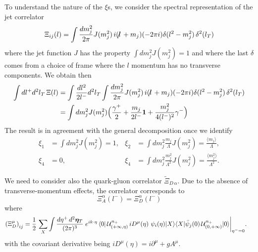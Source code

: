 \documentclass[preprintnumbers,floatfix,nofootinbib]{revtex4}
\newcommand{\lslash}{l \hspace{-0.19cm} / \,}
\newcommand{\de}{d}                    %
\newcommand{\ii}{i}                    %
\begin{document}
To understand the nature of the $\xi$s, we consider the spectral
representation of the jet correlator
\begin{equation}
\Xi_{ij}(l) = \int \frac{d m_j^2}{2 \pi} J(m_j^2)\, \ii (\lslash +m_j) (-2 \pi \ii)
\delta(l^2 -m_j^2) \, \delta^2(l_T)
\label{e:spectral}
\end{equation} 
where the jet function $J$ has the property $\int dm_j^2 J(m_j^2) = 1$ and 
where the last $\delta$ comes from a choice of frame where the $l$ momentum
has no transverse components.
We obtain then
\begin{equation}
\begin{split} 
\int d l^+ d^2 l_T\, \Xi(l) &= \int \frac{d l^2}{2l^-} d^2l_T  
 \int \frac{d m_j^2}{2 \pi} J(m_j^2)\, \ii (\lslash +m_j) (-2 \pi \ii)
\delta(l^2 -m_j^2) \, \delta^2(l_T)
\\
& = \int d m_j^2 J(m_j^2) \Bigl( \frac{\gamma^+}{2} + \frac{m_j}{2 l^-} {\bm 1}
+\frac{m_j^2}{4 (l^-)^2} \gamma^- \Bigr)
\label{e:jetspectral}
\end{split} 
\end{equation} 
The result is in agreement with the general decomposition once we identify
\begin{align}
\xi_1 &= \int dm_j^2 J(m_j^2) = 1,
&
\xi_2 &= \int dm_j^2 \frac{m_j}{\Lambda} J(m_j^2) = \frac{\langle m_j \rangle}{\Lambda},
\\
\xi_4 &= 0,
&
\xi_4 &= \int dm_j^2 \frac{m_j^2}{\Lambda^2} J(m_j^2) = \frac{\langle m_j^2 \rangle}{\Lambda^2}.
\end{align} 


We need to consider also the quark-gluon correlator 
$\tilde{\Xi}_{D\, \alpha}$. Due to the absence of transverse-momentum effects,
the correlator corresponds to
\begin{equation}
{\Xi}_A^{\alpha}(l^-) = 
\Xi_D^{\alpha} (l^-)
\label{e:DeltaA}
\end{equation}
where 
\begin{equation} 
\begin{split} 
\left(\Xi_D^{\mu} \right)_{ij} &=
\frac{1}{2}\, \sum_X
\int \frac{\de \eta^+\, \de^2 \bm{\eta}_T}{(2\pi)^{3}}\;
e^{\ii k \cdot \eta}\,
\langle 0|\,
{\cal U}^{n_+}_{(+\infty,\eta)}\,
i D^{\mu}(\eta)\,
\,\psi_i(\eta)|X\rangle
\langle X|
             \bar{\psi}_j(0)\,
{\cal U}^{n_+}_{(0,+\infty)}
|0\rangle \bigg|_{\eta^-=0} .
\label{e:DeltaD}
\end{split} 
\end{equation}  
with the covariant derivative being
 $\ii D^{\mu}(\eta) = \ii
\partial^{\mu}+ g A^{\mu}$.
\end{document}
